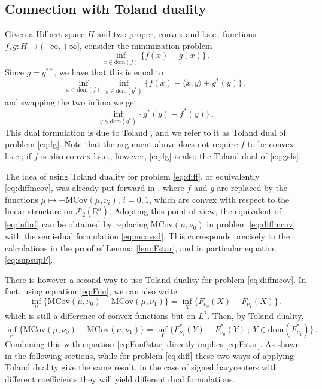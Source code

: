 \documentclass[12pt]{amsart}
\numberwithin{equation}{section}
\let\mc=\mathcal
\let\mr=\mathrm
\theoremstyle{plain}
\theoremstyle{definition}
\begin{document}
\subsection{Connection with Toland duality}\label{sec:toland} Given a Hilbert space $H$ and two proper, convex and l.s.c.\ functions $f,g: H \rightarrow (-\infty,+\infty]$, consider the minimization problem 
\begin{equation}\label{eq:fg}
\inf_{x\in \mathrm{dom}(f)} \{f(x) - g(x)\}\,. 
\end{equation}
Since $g = g^{**}$, we have that this is equal to 
\begin{equation}\label{eq:infinf}
\inf_{x\in \mathrm{dom}(f)} \inf_{y\in \mr{dom}(g^*)} \{f(x) - \langle x, y\rangle + g^*(y)\} \,,
\end{equation}
and swapping the two infima we get
\begin{equation}\label{eq:gsfs}
 \inf_{y\in \mr{dom}(g^*)} \{ g^*(y) - f^*(y)\}\,.
\end{equation}
This dual formulation is due to Toland \cite{toland1978duality}, and we refer to it as Toland dual of problem \eqref{eq:fg}.  
Note that the argument above does not require $f$ to be convex l.s.c.; if $f$ is also convex l.s.c., however, \eqref{eq:fg} is also the Toland dual of \eqref{eq:gsfs}. 

The idea of using Toland duality for problem \eqref{eq:diff}, or equivalently \eqref{eq:diffmcov}, was already put forward in \cite{carlier2008Toland}, where $f$ and $g$ are replaced by the functions $\mu \mapsto -\mr{MCov}(\mu,\nu_i)$, $i=0,1$, which are convex with respect to the linear structure on $\mc{P}_2(\mathbb{R}^d)$. Adopting this point of view, the equivalent of \eqref{eq:infinf} can be obtained by replacing $\mr{MCov}(\mu,\nu_0)$ in problem \eqref{eq:diffmcov} with the semi-dual formulation \eqref{eq:mcovsd}. This corresponds precisely to the calculations in the proof of Lemma \ref{lem:Fstar}, and in particular equation \eqref{eq:supsupF}.

There is however a second way to use Toland duality for problem \eqref{eq:diffmcov}. In fact, using equation \eqref{eq:Fnu}, we can also write
\[
\inf_\mu \{\mr{MCov}(\mu,\nu_0) - \mr{MCov}(\mu,\nu_1) \} = \inf_X \{ F_{\nu_0}(X) - F_{\nu_1}(X)\} \,.
\]
which is still a difference of convex functions but on $L^2$.
Then, by Toland duality,
\[
\inf_\mu \{\mr{MCov}(\mu,\nu_0) - \mr{MCov}(\mu,\nu_1) \} = \inf_Y \{ F^*_{\nu_1}(Y)-F^*_{\nu_0}(Y)~;~ Y \in \mr{dom}(F^*_{\nu_1})\}\,.
\]
Combining this with equation \eqref{eq:Fnu0star} directly implies \eqref{eq:Fstar}. As shown in the following sections, while for problem \eqref{eq:diff} these two ways of applying Toland duality give the same result, in the case of signed barycenters with different coefficients they will yield different dual formulations.
\end{document}
